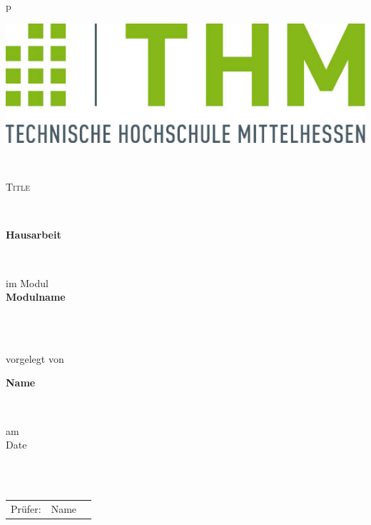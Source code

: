 \pagestyle{empty}
\begin{center}
	\begin{tabular}{p{\textwidth}}
		
		
		\begin{center}
			\includegraphics{img/logo.jpg}
		\end{center}
		
		
		\\
		
		\begin{center}
			\LARGE{\textsc{
					Title
			}}
		\end{center}
		
		
		
		\\
		
		\begin{center}
			\textbf{\Large{Hausarbeit}}
		\end{center}
		
		\\
		
		
		\begin{center}
			\small{im Modul \\
				\textbf{Modulname} \\}
		\end{center}
		\\
		\\
		\begin{center}
			vorgelegt von
		\end{center}
		
		\begin{center}
			\large{\textbf{Name}} \\
		\end{center}
		\\
		
		\begin{center}
			am\\
			\large{Date}
		\end{center}
		
		\\
		
		\\
		\begin{center}
			\begin{tabular}{ l c r }
				Prüfer: & Name \\
			\end{tabular}
		\end{center}
	\end{tabular}
\end{center}